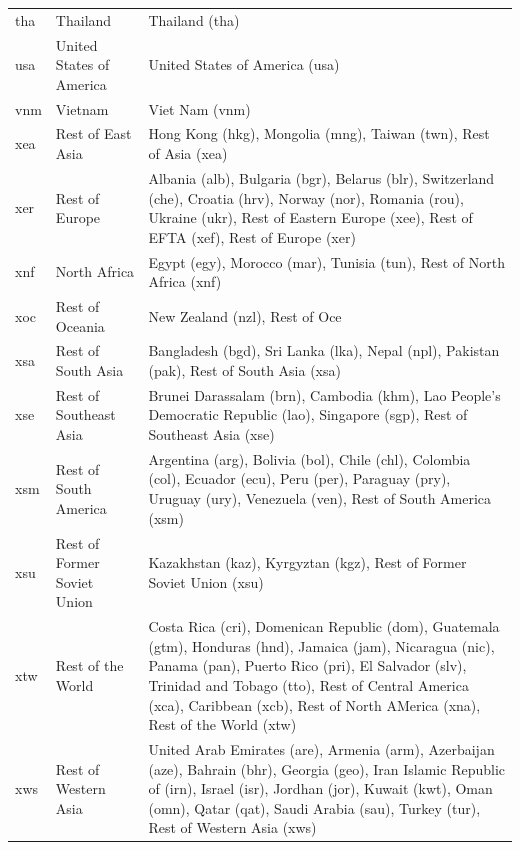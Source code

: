 \documentclass[titlesmallcaps,copyrightpage]{uomthesis}\usepackage[]{graphicx}\usepackage[]{color}
\begin{document}
\begin{table}[htb]
\begin{tabularx}{\textwidth}{llY}
tha & Thailand & Thailand (tha) \\
usa & United States of America & United States of America (usa) \\
vnm & Vietnam & Viet Nam (vnm) \\
xea & Rest of East Asia & Hong Kong (hkg), Mongolia (mng), Taiwan (twn), Rest of Asia (xea) \\
xer & Rest of Europe & Albania (alb), Bulgaria (bgr), Belarus (blr), Switzerland (che), Croatia (hrv), Norway (nor), Romania (rou), Ukraine (ukr), Rest of Eastern Europe (xee), Rest of EFTA (xef), Rest of Europe (xer) \\
xnf & North Africa & Egypt (egy), Morocco (mar), Tunisia (tun), Rest of North Africa (xnf) \\
xoc & Rest of Oceania & New Zealand (nzl), Rest of Oce \\
xsa & Rest of South Asia & Bangladesh (bgd), Sri Lanka (lka), Nepal (npl), Pakistan (pak), Rest of South Asia (xsa) \\
xse & Rest of Southeast Asia & Brunei Darassalam (brn), Cambodia (khm), Lao People's Democratic Republic (lao), Singapore (sgp), Rest of Southeast Asia (xse) \\
xsm & Rest of South America & Argentina (arg), Bolivia (bol), Chile (chl), Colombia (col), Ecuador (ecu), Peru (per), Paraguay (pry), Uruguay (ury), Venezuela (ven), Rest of South America (xsm) \\
xsu & Rest of Former Soviet Union & Kazakhstan (kaz), Kyrgyztan (kgz), Rest of Former Soviet Union (xsu) \\
xtw & Rest of the World & Costa Rica (cri), Domenican Republic (dom), Guatemala (gtm), Honduras (hnd), Jamaica (jam), Nicaragua (nic), Panama (pan), Puerto Rico (pri), El Salvador (slv), Trinidad and Tobago (tto), Rest of Central America (xca), Caribbean (xcb), Rest of North AMerica (xna), Rest of the World (xtw) \\
xws & Rest of Western Asia & United Arab Emirates (are), Armenia (arm), Azerbaijan (aze), Bahrain (bhr), Georgia (geo), Iran Islamic Republic of (irn), Israel (isr), Jordhan (jor), Kuwait (kwt), Oman (omn), Qatar (qat), Saudi Arabia (sau), Turkey (tur), Rest of Western Asia (xws) \\
\bottomrule
\end{tabularx}
\end{table}
\end{document}
